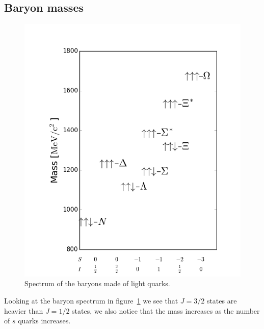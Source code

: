 \documentclass[12pt]{article}
\begin{document}
\subsection{Baryon masses}
\begin{figure}
\begin{center}
\includegraphics[scale=0.5,trim=7cm 1cm 5cm 5cm]{images/baryon.png}
\end{center}
\caption{Spectrum of the baryons made of light quarks.}\label{fig:baryonSpectrum}
\end{figure}
Looking at the baryon spectrum in figure~\ref{fig:baryonSpectrum} we see that $J=3/2$ states are heavier than $J=1/2$ states, we also notice that the mass increases as the number of $s$ quarks increases. 
\end{document}
